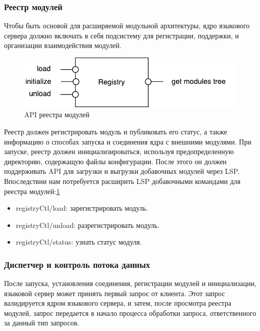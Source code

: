 \subsubsection{Реестр модулей}
\label{sec:met:arch:core:module_registry}

Чтобы быть основой для расширяемой модульной архитектуры, ядро языкового сервера должно включать в себя подсистему для регистрации, поддержки, и организации взаимодействия модулей.

\begin{figure}[H]
    \centering
    \includegraphics[width=.7\textwidth]{figs/registry.pdf}
    \caption{API реестра модулей}
    \label{fig:met:registry_methods}
\end{figure}

\newpage
Реестр должен регистрировать модуль и публиковать его статус, а также информацию о способах запуска и соединения ядра с внешними модулями. При запуске, реестр должен инициализироваться, используя предопределенную директорию, содержащую файлы конфигурации. После этого он должен поддерживать API для загрузки и выгрузки добавочных модулей через LSP. Впоследствии нам потребуется расширить LSP добавочными командами для реестра модулей:\ref{fig:met:registry_methods}

\begin{itemize}
    \item registryCtl/load: зарегистрировать модуль.
    \item registryCtl/unload: разрегистрировать модуль.
    \item registryCtl/status: узнать статус модуля.
\end{itemize}

\subsubsection{Диспетчер и контроль потока данных}
\label{sec:met:arch:core:dispatcher}
После запуска, установления соединения, регистрации модулей и инициализации, языковой сервер может принять первый запрос от клиента. Этот запрос валидируется ядром языкового сервера, и затем, после просмотра реестра модулей, запрос передается в начало процесса обработки запроса, ответственного за данный тип запросов.

